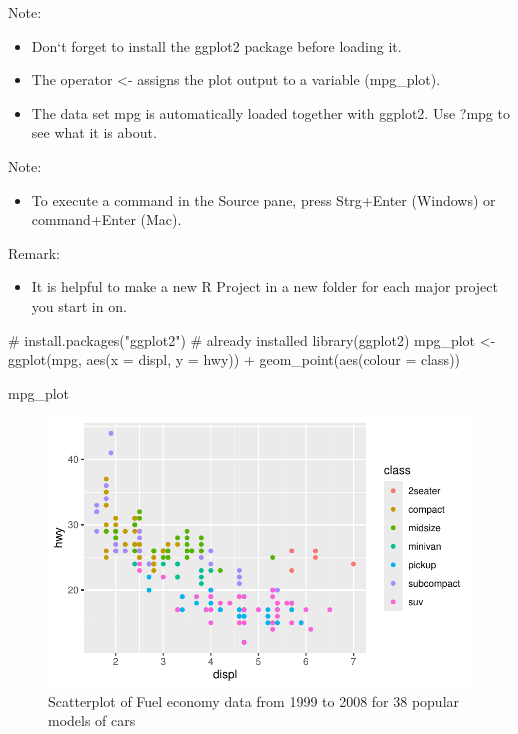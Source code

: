 \documentclass[
  letterpaper,
  DIV=11,
  numbers=noendperiod]{scrartcl}
\newenvironment{Shaded}{\begin{snugshade}}{\end{snugshade}}
\newcommand{\AttributeTok}[1]{\textcolor[rgb]{0.40,0.45,0.13}{#1}}
\newcommand{\CommentTok}[1]{\textcolor[rgb]{0.37,0.37,0.37}{#1}}
\newcommand{\FunctionTok}[1]{\textcolor[rgb]{0.28,0.35,0.67}{#1}}
\newcommand{\NormalTok}[1]{\textcolor[rgb]{0.00,0.23,0.31}{#1}}
\newcommand{\OtherTok}[1]{\textcolor[rgb]{0.00,0.23,0.31}{#1}}
\newcommand{\SpecialCharTok}[1]{\textcolor[rgb]{0.37,0.37,0.37}{#1}}
\providecommand{\tightlist}{%
  \setlength{\itemsep}{0pt}\setlength{\parskip}{0pt}}\usepackage{longtable,booktabs,array}
\begin{document}
Note:

\begin{itemize}
\item
  Don`t forget to install the ggplot2 package before loading it.
\item
  The operator \textless- assigns the plot output to a variable
  (mpg\_plot).
\item
  The data set mpg is automatically loaded together with ggplot2. Use
  ?mpg to see what it is about.
\end{itemize}

Note:

\begin{itemize}
\tightlist
\item
  To execute a command in the Source pane, press Strg+Enter (Windows) or
  command+Enter (Mac).
\end{itemize}

Remark:

\begin{itemize}
\tightlist
\item
  It is helpful to make a new R Project in a new folder for each major
  project you start in on.
\end{itemize}

\begin{Shaded}
\begin{Highlighting}[]
\CommentTok{\# install.packages("ggplot2") \# already installed}
\FunctionTok{library}\NormalTok{(ggplot2)}
\NormalTok{mpg\_plot }\OtherTok{\textless{}{-}} \FunctionTok{ggplot}\NormalTok{(mpg, }\FunctionTok{aes}\NormalTok{(}\AttributeTok{x =}\NormalTok{ displ, }\AttributeTok{y =}\NormalTok{ hwy)) }\SpecialCharTok{+} \FunctionTok{geom\_point}\NormalTok{(}\FunctionTok{aes}\NormalTok{(}\AttributeTok{colour =}\NormalTok{ class))}

\NormalTok{mpg\_plot}
\end{Highlighting}
\end{Shaded}

\begin{figure}[H]

{\centering \includegraphics{Part1_Lecture1_Ex_files/figure-pdf/fig-mpg-geom-point-1.pdf}

}

\caption{\label{fig-mpg-geom-point}Scatterplot of Fuel economy data from
1999 to 2008 for 38 popular models of cars}

\end{figure}
\end{document}
